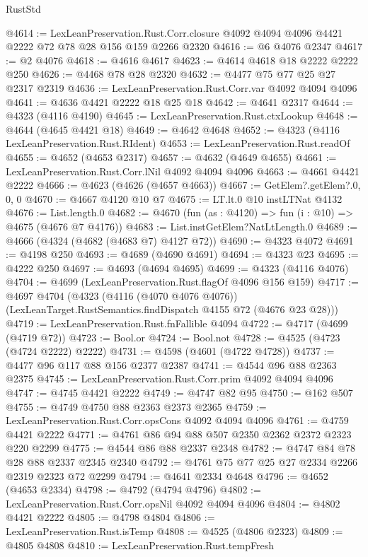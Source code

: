 \begin{lexlean}{RustStd}
\begin{coremodule}
@4614 := LexLeanPreservation.Rust.Corr.closure
    @4092
    @4094
    @4096
    @4421
    @2222
    @72
    @78
    @28
    @156
    @159
    @2266
    @2320
@4616 := @6 @4076 @2347
@4617 := @2 @4076
@4618 := @4616 @4617
@4623 := @4614 @4618 @18 @2222 @2222 @250
@4626 := @4468 @78 @28 @2320
@4632 := @4477 @75 @77 @25 @27 @2317 @2319
@4636 := LexLeanPreservation.Rust.Corr.var @4092 @4094 @4096
@4641 := @4636 @4421 @2222 @18 @25 @18
@4642 := @4641 @2317
@4644 := @4323 (@4116 @4190)
@4645 := LexLeanPreservation.Rust.ctxLookup
@4648 := @4644 (@4645 @4421 @18)
@4649 := @4642 @4648
@4652 := @4323 (@4116 LexLeanPreservation.Rust.RIdent)
@4653 := LexLeanPreservation.Rust.readOf
@4655 := @4652 (@4653 @2317)
@4657 := @4632 (@4649 @4655)
@4661 := LexLeanPreservation.Rust.Corr.lNil @4092 @4094 @4096
@4663 := @4661 @4421 @2222
@4666 := @4623 (@4626 (@4657 @4663))
@4667 := GetElem?.getElem?.{0, 0, 0}
@4670 := @4667 @4120 @10 @7
@4675 := LT.lt.{0} @10 instLTNat @4132
@4676 := List.length.{0}
@4682 := @4670 (fun (as : @4120) => fun (i : @10) => @4675 (@4676 @7 @4176))
@4683 := List.instGetElem?NatLtLength.{0}
@4689 := @4666 (@4324 (@4682 (@4683 @7) @4127 @72))
@4690 := @4323 @4072
@4691 := @4198 @250
@4693 := @4689 (@4690 @4691)
@4694 := @4323 @23
@4695 := @4222 @250
@4697 := @4693 (@4694 @4695)
@4699 := @4323 (@4116 @4076)
@4704 := @4699 (LexLeanPreservation.Rust.flagOf @4096 @156 @159)
@4717 := @4697
    @4704
    (@4323
      (@4116 (@4070 @4076 @4076))
      (LexLeanTarget.RustSemantics.findDispatch @4155 @72 (@4676 @23 @28)))
@4719 := LexLeanPreservation.Rust.fnFallible @4094
@4722 := @4717 (@4699 (@4719 @72))
@4723 := Bool.or
@4724 := Bool.not
@4728 := @4525 (@4723 (@4724 @2222) @2222)
@4731 := @4598 (@4601 (@4722 @4728))
@4737 := @4477 @96 @117 @88 @156 @2377 @2387
@4741 := @4544 @96 @88 @2363 @2375
@4745 := LexLeanPreservation.Rust.Corr.prim @4092 @4094 @4096
@4747 := @4745 @4421 @2222
@4749 := @4747 @82 @95
@4750 := @162 @507
@4755 := @4749 @4750 @88 @2363 @2373 @2365
@4759 := LexLeanPreservation.Rust.Corr.opsCons @4092 @4094 @4096
@4761 := @4759 @4421 @2222
@4771 := @4761 @86 @94 @88 @507 @2350 @2362 @2372 @2323 @220 @2299
@4775 := @4544 @86 @88 @2337 @2348
@4782 := @4747 @84 @78 @28 @88 @2337 @2345 @2340
@4792 := @4761 @75 @77 @25 @27 @2334 @2266 @2319 @2323 @72 @2299
@4794 := @4641 @2334 @4648
@4796 := @4652 (@4653 @2334)
@4798 := @4792 (@4794 @4796)
@4802 := LexLeanPreservation.Rust.Corr.opsNil @4092 @4094 @4096
@4804 := @4802 @4421 @2222
@4805 := @4798 @4804
@4806 := LexLeanPreservation.Rust.isTemp
@4808 := @4525 (@4806 @2323)
@4809 := @4805 @4808
@4810 := LexLeanPreservation.Rust.tempFresh

\end{coremodule}
\end{lexlean}
